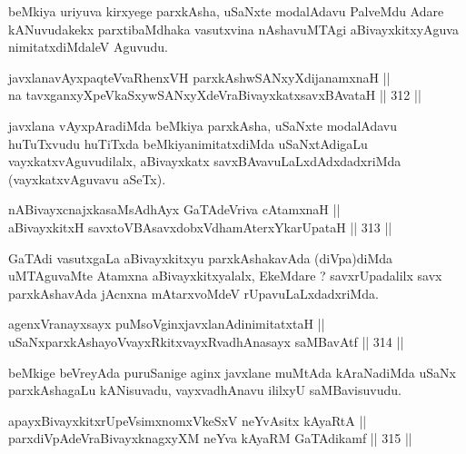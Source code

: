 \begin{artha}
beMkiya uriyuva kirxyege parxkAsha, uSaNxte modalAdavu PalveMdu Adare
kANuvudakekx parxtibaMdhaka vasutxvina nAshavuMTAgi aBivayxkitxyAguva
nimitatxdiMdaleV Aguvudu.
\end{artha}


\begin{shl}
javxlanavAyxpaqteVvaRhenxVH parxkAshwSANxyXdijanamxnaH || \\
na tavxganxyXpeVkaSxywSANxyXdeVraBivayxkatxsavxBAvataH \hfill || 312 ||  
\end{shl}

\begin{artha}
javxlana vAyxpAradiMda beMkiya parxkAsha, uSaNxte modalAdavu
huTuTxvudu huTiTxda beMkiyanimitatxdiMda uSaNxtAdigaLu
vayxkatxvAguvudilalx, aBivayxkatx savxBAvavuLaLxdAdxdadxriMda
(vayxkatxvAguvavu aSeTx).
\end{artha}

\begin{shl}
nABivayxcnajxkasaMsAdhAyx GaTAdeVriva cA\s \s tamxnaH || \\
aBivayxkitxH savxtoVBAsavxdobxVdhamAterxYkarUpataH \hfill || 313 ||  
\end{shl}

\begin{artha}
GaTAdi vasutxgaLa aBivayxkitxyu parxkAshakavAda (diVpa)diMda
uMTAguvaMte Atamxna aBivayxkitxyalalx, EkeMdare ? savxrUpadalilx savx
parxkAshavAda jAcnxna mAtarxvoMdeV rUpavuLaLxdadxriMda.
\end{artha}


\begin{shl}
agenxVranayxsayx puMsoV\s ginxjavxlanAdinimitatxtaH ||  \\
uSaNxparxkAshayoVvayxRkitxvayxRvadhAnasayx saMBavAtf \hfill || 314 ||  
\end{shl}

\begin{artha}
beMkige beVreyAda puruSanige aginx javxlane muMtAda kAraNadiMda uSaNx
parxkAshagaLu kANisuvadu, vayxvadhAnavu ililxyU saMBavisuvudu.
\end{artha}

\begin{shl}
apayxBivayxkitxrUpeV\s simxnomxVkeSxV neYvAsitx kAyaRtA || \\
parxdiVpAdeVraBivayxknagxyXM neYva kAyaRM GaTAdikamf \hfill || 315 ||  
\end{shl}

